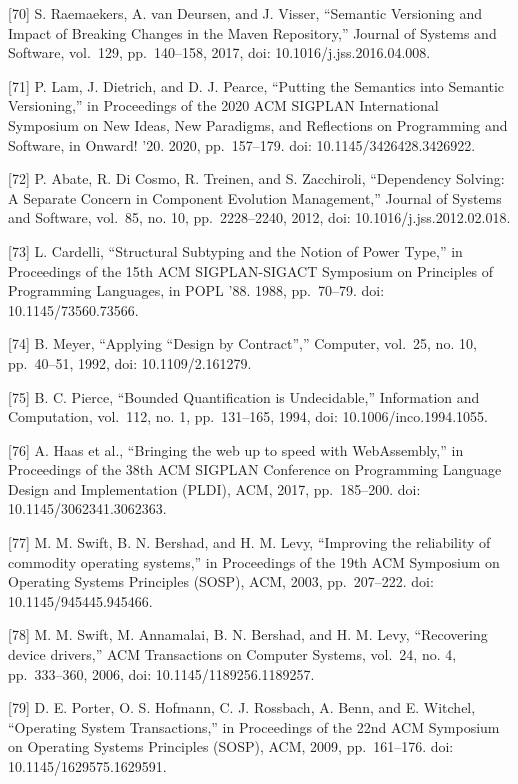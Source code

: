 \documentclass[
  10
]{article}
\begin{document}
{[}70{]} S. Raemaekers, A. van Deursen, and J. Visser, ``Semantic Versioning and
Impact of Breaking Changes in the Maven Repository,'' Journal of Systems and
Software, vol.~129, pp.~140--158, 2017, doi: 10.1016/j.jss.2016.04.008.

{[}71{]} P. Lam, J. Dietrich, and D. J. Pearce, ``Putting the Semantics into Semantic
Versioning,'' in Proceedings of the 2020 ACM SIGPLAN International Symposium on New
Ideas, New Paradigms, and Reflections on Programming and Software, in Onward! '20.
2020, pp.~157--179. doi: 10.1145/3426428.3426922.

{[}72{]} P. Abate, R. Di Cosmo, R. Treinen, and S. Zacchiroli, ``Dependency Solving:
A Separate Concern in Component Evolution Management,'' Journal of Systems and
Software, vol.~85, no. 10, pp.~2228--2240, 2012, doi: 10.1016/j.jss.2012.02.018.

{[}73{]} L. Cardelli, ``Structural Subtyping and the Notion of Power Type,'' in
Proceedings of the 15th ACM SIGPLAN-SIGACT Symposium on Principles of Programming
Languages, in POPL '88. 1988, pp.~70--79. doi: 10.1145/73560.73566.

{[}74{]} B. Meyer, ``Applying ``Design by Contract'','' Computer, vol.~25, no. 10,
pp.~40--51, 1992, doi: 10.1109/2.161279.

{[}75{]} B. C. Pierce, ``Bounded Quantification is Undecidable,'' Information and
Computation, vol.~112, no. 1, pp.~131--165, 1994, doi: 10.1006/inco.1994.1055.

{[}76{]} A. Haas et al., ``Bringing the web up to speed with WebAssembly,'' in
Proceedings of the 38th ACM SIGPLAN Conference on Programming Language Design and
Implementation (PLDI), ACM, 2017, pp.~185--200. doi: 10.1145/3062341.3062363.

{[}77{]} M. M. Swift, B. N. Bershad, and H. M. Levy, ``Improving the reliability of
commodity operating systems,'' in Proceedings of the 19th ACM Symposium on Operating
Systems Principles (SOSP), ACM, 2003, pp.~207--222. doi: 10.1145/945445.945466.

{[}78{]} M. M. Swift, M. Annamalai, B. N. Bershad, and H. M. Levy, ``Recovering
device drivers,'' ACM Transactions on Computer Systems, vol.~24, no. 4, pp.~333--360,
2006, doi: 10.1145/1189256.1189257.

{[}79{]} D. E. Porter, O. S. Hofmann, C. J. Rossbach, A. Benn, and E. Witchel,
``Operating System Transactions,'' in Proceedings of the 22nd ACM Symposium on
Operating Systems Principles (SOSP), ACM, 2009, pp.~161--176. doi: 10.1145/1629575.1629591.
\end{document}
